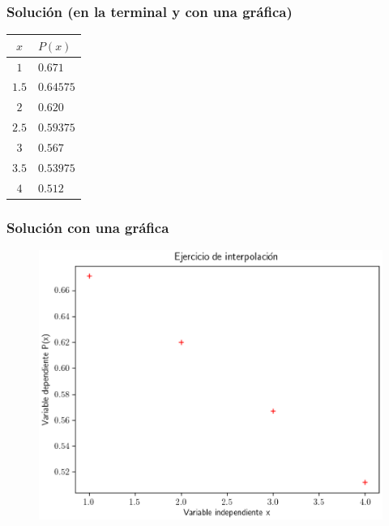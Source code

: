 \documentclass[12pt]{beamer}
\begin{document}
\begin{frame}[fragile]
\frametitle{Solución (en la terminal y con una gráfica)}
\begin{table}
\centering
\renewcommand{\arraystretch}{0.9}
\begin{tabular}{c | l}
$x$ & $P (x)$ \\
\hline $1$   & $0.671$ \\
\hline $1.5$ & $0.64575$ \\
\hline $2$   & $0.620$ \\
\hline $2.5$ & $0.59375$ \\
\hline $3$   & $0.567$ \\
\hline $3.5$ & $0.53975$ \\
\hline $4$   & $0.512$
\end{tabular}
\end{table}
\end{frame}
\begin{frame}
\frametitle{Solución con una gráfica}
\begin{figure}
	\centering
	\includegraphics[scale=0.6]{Imagenes/Ejercicio_Interpolacion_01.eps}
\end{figure}
\end{frame}
\end{document}
